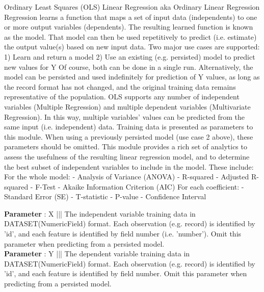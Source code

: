 \par
Ordinary Least Squares (OLS) Linear Regression aka Ordinary Linear Regression Regression learns a function that maps a set of input data (independents) to one or more output variables (dependents). The resulting learned function is known as the model. That model can then be used repetitively to predict (i.e. estimate) the output value(s) based on new input data. Two major use cases are supported: 1) Learn and return a model 2) Use an existing (e.g. persisted) model to predict new values for Y Of course, both can be done in a single run. Alternatively, the model can be persisted and used indefinitely for prediction of Y values, as long as the record format has not changed, and the original training data remains representative of the population. OLS supports any number of independent variables (Multiple Regression) and multiple dependent variables (Multivariate Regression). In this way, multiple variables' values can be predicted from the same input (i.e. independent) data. Training data is presented as parameters to this module. When using a previously persisted model (use case 2 above), these parameters should be omitted. This module provides a rich set of analytics to assess the usefulness of the resulting linear regression model, and to determine the best subset of independent variables to include in the model. These include: For the whole model: - Analysis of Variance (ANOVA) - R-squared - Adjusted R-squared - F-Test - Akaike Information Criterion (AIC) For each coefficient: - Standard Error (SE) - T-statistic - P-value - Confidence Interval
\par
\textbf{Parameter} : X ||| The independent variable training data in DATASET(NumericField) format. Each observation (e.g. record) is identified by 'id', and each feature is identified by field number (i.e. 'number'). Omit this parameter when predicting from a persisted model. \\
\textbf{Parameter} : Y ||| The dependent variable training data in DATASET(NumericField) format. Each observation (e.g. record) is identified by 'id', and each feature is identified by field number. Omit this parameter when predicting from a persisted model. \\
